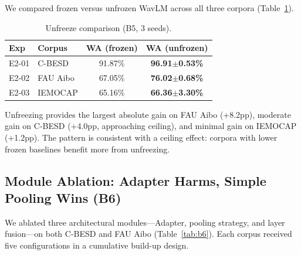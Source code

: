 We compared frozen versus unfrozen WavLM across all three corpora (Table~\ref{tab:b5}).

\begin{table}[h]
\centering
\caption{Unfreeze comparison (B5, 3 seeds).}
\label{tab:b5}
\begin{tabular}{llcc}
\toprule
\textbf{Exp} & \textbf{Corpus} & \textbf{WA (frozen)} & \textbf{WA (unfrozen)} \\
\midrule
E2-01 & C-BESD   & 91.87\% & \textbf{96.91$\pm$0.53\%} \\
E2-02 & FAU Aibo & 67.05\% & \textbf{76.02$\pm$0.68\%} \\
E2-03 & IEMOCAP  & 65.16\% & \textbf{66.36$\pm$3.30\%} \\
\bottomrule
\end{tabular}
\end{table}

Unfreezing provides the largest absolute gain on FAU Aibo (+8.2pp), moderate gain on C-BESD (+4.0pp, approaching ceiling), and minimal gain on IEMOCAP (+1.2pp). The pattern is consistent with a ceiling effect: corpora with lower frozen baselines benefit more from unfreezing.

\subsection{Module Ablation: Adapter Harms, Simple Pooling Wins (B6)}

We ablated three architectural modules---Adapter, pooling strategy, and layer fusion---on both C-BESD and FAU Aibo (Table~\ref{tab:b6}). Each corpus received five configurations in a cumulative build-up design.

